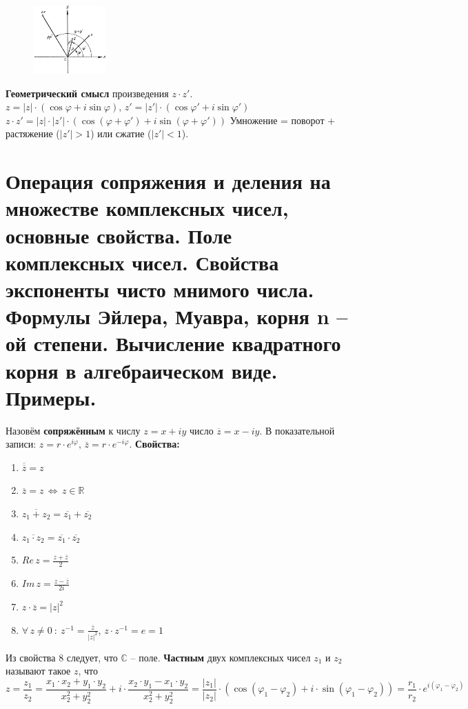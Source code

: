 \documentclass{article}
\newcommand{\R}{\mathbb R}
\newcommand{\n}{\bigbreak}
\begin{document}
\begin{figure}
    \centering
    \includegraphics[width=0.25\textwidth]{ko.png}
\end{figure}
\textbf{Геометрический смысл} произведения $z\cdot z'$.
\newline
\newline
$z=|z|\cdot(\cos\varphi+i\sin\varphi),\,z'=|z'|\cdot(\cos\varphi'+i\sin\varphi')$
\newline
\newline
$z\cdot z'=|z|\cdot|z'|\cdot(\cos(\varphi+\varphi')+i\sin(\varphi+\varphi'))$
\newline
\newline
Умножение = поворот + растяжение ($|z'|>1$) или сжатие ($|z'|<1$).

\newpage
\section{Операция сопряжения и деления на множестве комплексных чисел, основные свойства. Поле комплексных чисел. Свойства экспоненты чисто мнимого числа. Формулы Эйлера, Муавра, корня n – ой степени. Вычисление квадратного корня в алгебраическом виде. Примеры.}
Назовём \textbf{сопряжённым} к числу $z=x+iy$ число $\overline{z}=x-iy$. В показательной записи: $z=r\cdot e^{i\varphi},\,\overline{z}=r\cdot e^{-i\varphi}$.
\n 
\textbf{Свойства:}
\begin{enumerate}
    \item $\overline{\overline{z}}=z$
    \item $\overline{z}=z\,\Leftrightarrow\,z\in\R$
    \item $\overline{z_1+z_2}=\overline{z_1}+\overline{z_2}$
    \item $\overline{z_1\cdot z_2}=\overline{z_1}\cdot\overline{z_2}$
    \item $Re\, z=\frac{z+\overline{z}}{2}$
    \item $Im\,z=\frac{z-\overline{z}}{2i}$
    \item $z\cdot\overline{z}=|z|^2$
    \item $\forall\,z\neq 0\::\:z^{-1}=\frac{\overline{z}}{|z|^2}$, $z\cdot z^{-1}=e=1$
\end{enumerate}
Из свойства 8 следует, что $\mathbb{C}$ -- поле.
\newline
\newline
\textbf{Частным} двух комплексных чисел $z_1$ и $z_2$ называют такое $z$, что
$$z=\frac{z_1}{z_2}=\frac{x_1\cdot x_2+y_1\cdot y_2}{x_2^2+y_2^2}+i\cdot\frac{x_2\cdot y_1-x_1\cdot y_2}{x_2^2+y_2^2} = \frac{|z_1|}{|z_2|}\cdot(\cos(\varphi_1-\varphi_2)+i\cdot\sin(\varphi_1-\varphi_2)) = \frac{r_1}{r_2} \cdot e^{i(\varphi_1 - \varphi_2)} $$
\end{document}
